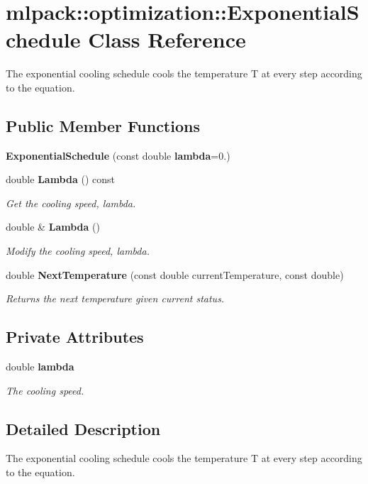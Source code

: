 \section{mlpack\+:\+:optimization\+:\+:Exponential\+Schedule Class Reference}
\label{classmlpack_1_1optimization_1_1ExponentialSchedule}


The exponential cooling schedule cools the temperature T at every step according to the equation.  


\subsection*{Public Member Functions}
\begin{DoxyCompactItemize}
\item 
{\bf Exponential\+Schedule} (const double {\bf lambda}=0.)
\item 
double {\bf Lambda} () const 
\begin{DoxyCompactList}\small\item\em Get the cooling speed, lambda. \end{DoxyCompactList}\item 
double \& {\bf Lambda} ()
\begin{DoxyCompactList}\small\item\em Modify the cooling speed, lambda. \end{DoxyCompactList}\item 
double {\bf Next\+Temperature} (const double current\+Temperature, const double)
\begin{DoxyCompactList}\small\item\em Returns the next temperature given current status. \end{DoxyCompactList}\end{DoxyCompactItemize}
\subsection*{Private Attributes}
\begin{DoxyCompactItemize}
\item 
double {\bf lambda}
\begin{DoxyCompactList}\small\item\em The cooling speed. \end{DoxyCompactList}\end{DoxyCompactItemize}


\subsection{Detailed Description}
The exponential cooling schedule cools the temperature T at every step according to the equation. 

